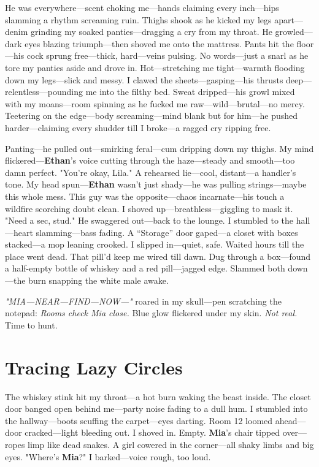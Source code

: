 \documentclass{article}
\begin{document}
He was everywhere—scent choking me—hands claiming every inch—hips slamming a rhythm screaming ruin. Thighs shook as he kicked my legs apart—denim grinding my soaked panties—dragging a cry from my throat. He growled—dark eyes blazing triumph—then shoved me onto the mattress. Pants hit the floor—his cock sprung free—thick, hard—veins pulsing. No words—just a snarl as he tore my panties aside and drove in. Hot—stretching me tight—warmth flooding down my legs—slick and messy. I clawed the sheets—gasping—his thrusts deep—relentless—pounding me into the filthy bed. Sweat dripped—his growl mixed with my moans—room spinning as he fucked me raw—wild—brutal—no mercy. Teetering on the edge—body screaming—mind blank but for him—he pushed harder—claiming every shudder till I broke—a ragged cry ripping free.

Panting—he pulled out—smirking feral—cum dripping down my thighs. My mind flickered—\textbf{Ethan}’s voice cutting through the haze—steady and smooth—too damn perfect. "You’re okay, Lila." A rehearsed lie—cool, distant—a handler’s tone. My head spun—\textbf{Ethan} wasn’t just shady—he was pulling strings—maybe this whole mess. This guy was the opposite—chaos incarnate—his touch a wildfire scorching doubt clean. I shoved up—breathless—giggling to mask it. "Need a sec, stud." He swaggered out—back to the lounge. I stumbled to the hall—heart slamming—bass fading. A “Storage” door gaped—a closet with boxes stacked—a mop leaning crooked. I slipped in—quiet, safe. Waited hours till the place went dead. That pill’d keep me wired till dawn. Dug through a box—found a half-empty bottle of whiskey and a red pill—jagged edge. Slammed both down—the burn snapping the white male awake.

\textit{"MIA—NEAR—FIND—NOW—"} roared in my skull—pen scratching the notepad: \textit{Rooms check Mia close.} Blue glow flickered under my skin. \textit{Not real.} Time to hunt.

\section*{Tracing Lazy Circles}

The whiskey stink hit my throat—a hot burn waking the beast inside. The closet door banged open behind me—party noise fading to a dull hum. I stumbled into the hallway—boots scuffing the carpet—eyes darting. Room 12 loomed ahead—door cracked—light bleeding out. I shoved in. Empty. \textbf{Mia}’s chair tipped over—ropes limp like dead snakes. A girl cowered in the corner—all shaky limbs and big eyes. "Where’s \textbf{Mia}?" I barked—voice rough, too loud.
\end{document}
